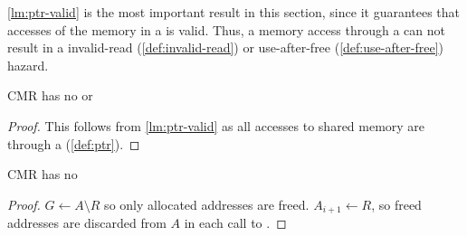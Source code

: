 \cref{lm:ptr-valid} is the most important result in this section, since it guarantees that
accesses of the memory in a  is valid. Thus, a memory access through a  can not
result in a invalid-read (\cref{def:invalid-read}) or use-after-free (\cref{def:use-after-free})
hazard.

\begin{lemma}
  CMR has no  or 
\end{lemma}
\begin{proof}
  This follows from \cref{lm:ptr-valid} as all accesses to shared memory are through a 
  (\cref{def:ptr}).
\end{proof}

\begin{lemma}
  CMR has no 
\end{lemma}
\begin{proof}
  $G \gets A \setminus R$ so only allocated addresses are freed. $A_{i+1} \gets R$, so freed
  addresses are discarded from $A$ in each call to .
\end{proof}
